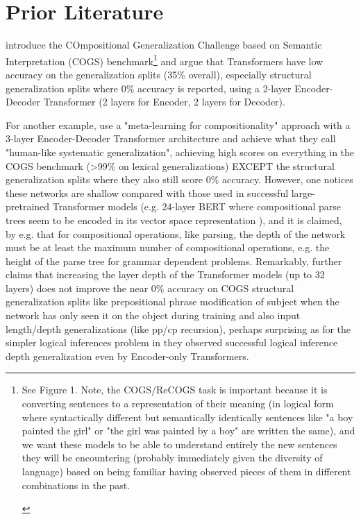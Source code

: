 \documentclass[11pt]{article}
\begin{document}
\section{Prior Literature}

\cite{KimLinzen2020} introduce the COmpositional Generalization Challenge based on Semantic Interpretation (COGS) benchmark\footnote{
\begin{tiny}
See Figure 1. Note, the COGS/ReCOGS task is important because it is converting sentences to a representation of their meaning (in logical form where syntactically different but semantically identically sentences like "a boy painted the girl" or "the girl was painted by a boy" are written the same), and we want these models to be able to understand entirely the new sentences they will be encountering (probably immediately given the diversity of language) based on being familiar having observed pieces of them in different combinations in the past.
\end{tiny}
} and argue that Transformers have low accuracy on the generalization splits (35\% overall), especially structural generalization splits where 0\% accuracy is reported, using a 2-layer Encoder-Decoder Transformer (2 layers for Encoder, 2 layers for Decoder).

For another example, \cite{lake2023human} use a "meta-learning for compositionality" approach with a 3-layer Encoder-Decoder Transformer architecture and achieve what they call "human-like systematic generalization", achieving high scores on everything in the COGS benchmark (>99\% on lexical generalizations) EXCEPT the structural generalization splits where they also still score 0\% accuracy.
However, one notices these networks are shallow compared with those used in successful large-pretrained Transformer models (e.g. 24-layer BERT where compositional parse trees seem to be encoded in its vector space representation \cite{hewitt-manning-2019-structural}), and it is claimed, by e.g. \cite{Csordas2022} that for compositional operations, like parsing, the depth of the network must be at least the maximum number of compositional operations, e.g. the height of the parse tree for grammar dependent problems. Remarkably, \cite{petty2024impactdepthcompositionalgeneralization} further claims that increasing the layer depth of the Transformer models (up to 32 layers) does not improve the near 0\% accuracy on COGS structural generalization splits like prepositional phrase modification of subject when the network has only seen it on the object during training and also input length/depth generalizations (like pp/cp recursion), perhaps surprising as for the simpler logical inferences problem in \cite{Clark2020} they observed successful logical inference depth generalization even by Encoder-only Transformers.
\end{document}
